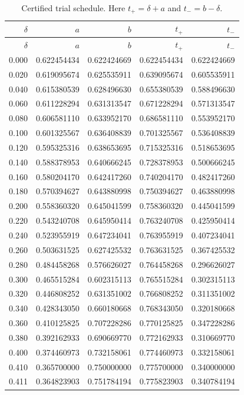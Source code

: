 \documentclass[11pt]{article}
\theoremstyle{definition}
\begin{document}
\begin{longtable}{@{}r r r r r@{}}
\caption{Certified trial schedule.  Here $t_+=\delta+a$ and $t_-=b-\delta$.}
\label{tab:schedule}\\
\toprule
$\delta$ & $a$ & $b$ & $t_+$ & $t_-$\\
\midrule
\endfirsthead
\toprule
$\delta$ & $a$ & $b$ & $t_+$ & $t_-$\\
\midrule
\endhead
0.000&0.622454434&0.622424669&0.622454434&0.622424669\\
0.020&0.619095674&0.625535911&0.639095674&0.605535911\\
0.040&0.615380539&0.628496630&0.655380539&0.588496630\\
0.060&0.611228294&0.631313547&0.671228294&0.571313547\\
0.080&0.606581110&0.633952170&0.686581110&0.553952170\\
0.100&0.601325567&0.636408839&0.701325567&0.536408839\\
0.120&0.595325316&0.638653695&0.715325316&0.518653695\\
0.140&0.588378953&0.640666245&0.728378953&0.500666245\\
0.160&0.580204170&0.642417260&0.740204170&0.482417260\\
0.180&0.570394627&0.643880998&0.750394627&0.463880998\\
0.200&0.558360320&0.645041599&0.758360320&0.445041599\\
0.220&0.543240708&0.645950414&0.763240708&0.425950414\\
0.240&0.523955919&0.647234041&0.763955919&0.407234041\\
0.260&0.503631525&0.627425532&0.763631525&0.367425532\\
0.280&0.484458268&0.576626027&0.764458268&0.296626027\\
0.300&0.465515284&0.602315113&0.765515284&0.302315113\\
0.320&0.446808252&0.631351002&0.766808252&0.311351002\\
0.340&0.428343050&0.660180668&0.768343050&0.320180668\\
0.360&0.410125825&0.707228286&0.770125825&0.347228286\\
0.380&0.392162933&0.690669770&0.772162933&0.310669770\\
0.400&0.374460973&0.732158061&0.774460973&0.332158061\\
0.410&0.365700000&0.750000000&0.775700000&0.340000000\\
0.411&0.364823903&0.751784194&0.775823903&0.340784194\\
\bottomrule
\end{longtable}
\end{document}
